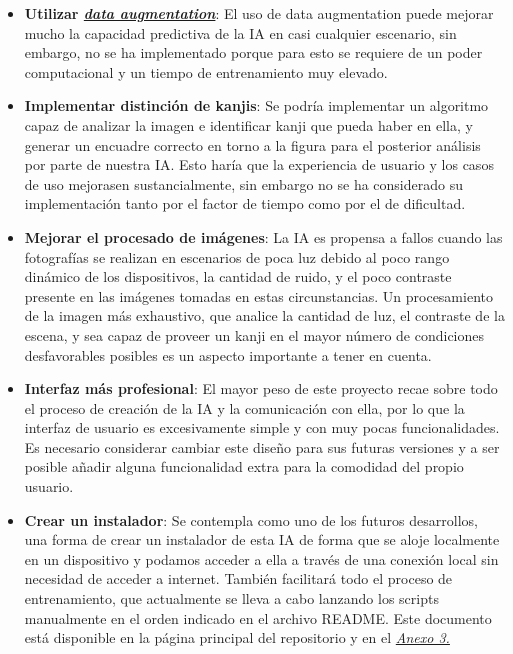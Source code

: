 \documentclass{article}
\begin{document}
\begin{itemize}
	\item \textbf{Utilizar \hyperref[sec:terms]{\textit{data augmentation}\tec}}: El uso de data augmentation puede mejorar mucho la capacidad predictiva de la IA en casi cualquier escenario, sin embargo, no se ha implementado porque para esto se requiere de un poder computacional y un tiempo de entrenamiento muy elevado.
	\item \textbf{Implementar distinción de kanjis}: Se podría implementar un algoritmo capaz de analizar la imagen e identificar kanji que pueda haber en ella, y generar un encuadre correcto en torno a la figura para el posterior análisis por parte de nuestra IA. Esto haría que la experiencia de usuario y los casos de uso mejorasen sustancialmente, sin embargo no se ha considerado su implementación tanto por el factor de tiempo como por el de dificultad.

	\item \textbf{Mejorar el procesado de imágenes}: La IA es propensa a fallos cuando las fotografías se realizan en escenarios de poca luz debido al poco rango dinámico de los dispositivos, la cantidad de ruido, y el poco contraste presente en las imágenes tomadas en estas circunstancias. Un procesamiento de la imagen más exhaustivo, que analice la cantidad de luz, el contraste de la escena, y sea capaz de proveer un kanji en el mayor número de condiciones desfavorables posibles es un aspecto importante a tener en cuenta.
	\item \textbf{Interfaz más profesional}: El mayor peso de este proyecto recae sobre todo el proceso de creación de la IA y la comunicación con ella, por lo que la interfaz de usuario es excesivamente simple y con muy pocas funcionalidades. Es necesario considerar cambiar este diseño para sus futuras versiones y a ser posible añadir alguna funcionalidad extra para la comodidad del propio usuario.
	\item \textbf{Crear un instalador}: Se contempla como uno de los futuros desarrollos, una forma de crear un instalador de esta IA de forma que se aloje localmente en un dispositivo y podamos acceder a ella a través de una conexión local sin necesidad de acceder a internet. También facilitará todo el proceso de entrenamiento, que actualmente se lleva a cabo lanzando los scripts manualmente en el orden indicado en el archivo README. Este documento está disponible en la página principal del repositorio y en el \hyperref[sec:DevGuide]{\textit{Anexo 3.}}
\end{itemize}
\end{document}
